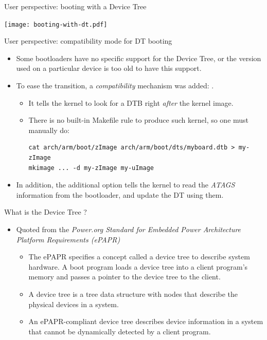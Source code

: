 \documentclass[obeyspaces,spaces,hyphens]{beamer}
\begin{document}
\begin{frame}{User perspective: booting with a Device Tree}
  \begin{center}
    \texttt{[image: booting-with-dt.pdf]}
  \end{center}
\end{frame}

\begin{frame}[fragile]{User perspective: compatibility mode for DT booting}
  \begin{itemize}
  \item Some bootloaders have no specific support for the Device Tree,
    or the version used on a particular device is too old to have this
    support.
  \item To ease the transition, a {\em compatibility} mechanism was
    added: .
    \begin{itemize}
    \item It tells the kernel to look for a DTB right {\em after} the
      kernel image.
    \item There is no built-in Makefile rule to produce such kernel,
      so one must manually do:
      \begin{block}{}
        \begin{verbatim}
cat arch/arm/boot/zImage arch/arm/boot/dts/myboard.dtb > my-zImage
mkimage ... -d my-zImage my-uImage
\end{verbatim}
\end{block}
\end{itemize}
  \item In addition, the additional option
     tells the kernel to read the
    {\em ATAGS} information from the bootloader, and update the DT
    using them.
  \end{itemize}
\end{frame}

\begin{frame}{What is the Device Tree ?}
  \begin{itemize}
  \item Quoted from the {\em Power.org Standard for Embedded Power
      Architecture Platform Requirements (ePAPR)}
    \begin{itemize}
    \item The ePAPR specifies a concept called a device tree to
      describe system hardware. A boot program loads a device tree
      into a client program’s memory and passes a pointer to the
      device tree to the client.
    \item A device tree is a tree data structure with nodes that
      describe the physical devices in a system.
    \item An ePAPR-compliant device tree describes device
      information in a system that cannot be dynamically detected by a
      client program.
    \end{itemize}
  \end{itemize}
\end{frame}
\end{document}
